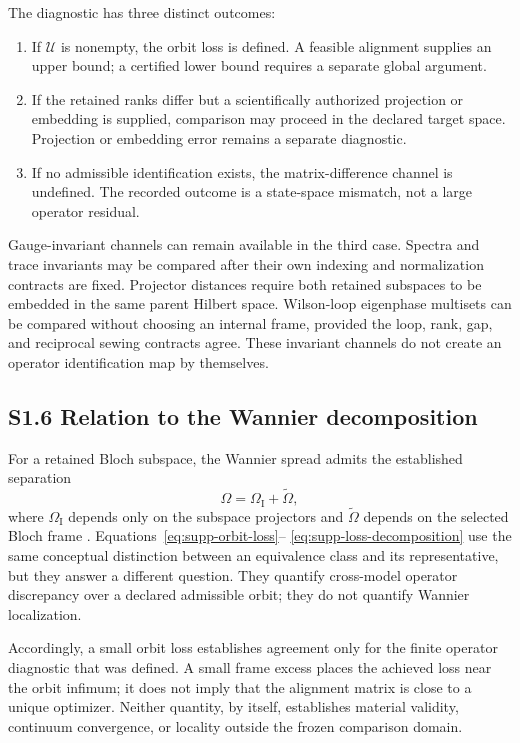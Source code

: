 The diagnostic has three distinct outcomes:
\begin{enumerate}
 \item If $\mathcal U$ is nonempty, the orbit loss is defined. A feasible
 alignment supplies an upper bound; a certified lower bound requires a separate
 global argument.
 \item If the retained ranks differ but a scientifically authorized projection
 or embedding is supplied, comparison may proceed in the declared target space.
 Projection or embedding error remains a separate diagnostic.
 \item If no admissible identification exists, the matrix-difference channel is
 undefined. The recorded outcome is a state-space mismatch, not a large
 operator residual.
\end{enumerate}

Gauge-invariant channels can remain available in the third case. Spectra and
trace invariants may be compared after their own indexing and normalization
contracts are fixed. Projector distances require both retained subspaces to be
embedded in the same parent Hilbert space. Wilson-loop eigenphase multisets can
be compared without choosing an internal frame, provided the loop, rank, gap,
and reciprocal sewing contracts agree. These invariant channels do not create
an operator identification map by themselves.

\subsection*{S1.6 Relation to the Wannier decomposition}

For a retained Bloch subspace, the Wannier spread admits the established
separation
\[
 \Omega=\Omega_{\mathrm I}+\widetilde\Omega,
\]
where $\Omega_{\mathrm I}$ depends only on the subspace projectors and
$\widetilde\Omega$ depends on the selected Bloch frame
\cite{marzari1997,marzari2012}. Equations~\eqref{eq:supp-orbit-loss}--
\eqref{eq:supp-loss-decomposition} use the same conceptual distinction between
an equivalence class and its representative, but they answer a different
question. They quantify cross-model operator discrepancy over a declared
admissible orbit; they do not quantify Wannier localization.

Accordingly, a small orbit loss establishes agreement only for the finite
operator diagnostic that was defined. A small frame excess places the achieved
loss near the orbit infimum; it does not imply that the alignment matrix is
close to a unique optimizer. Neither quantity, by itself, establishes material
validity, continuum convergence, or locality outside the frozen comparison
domain.

